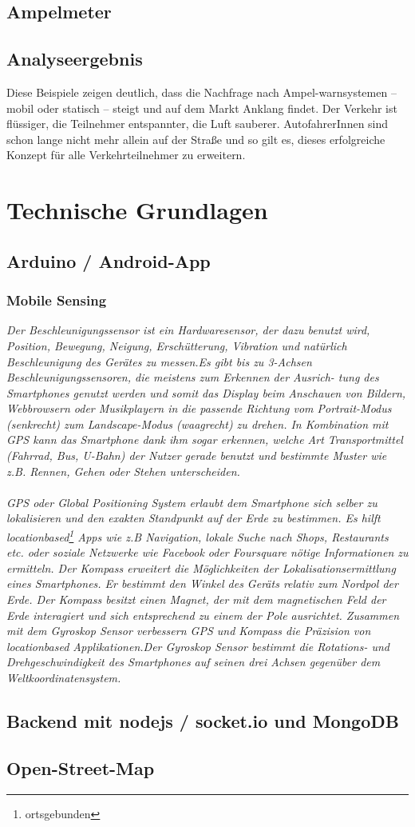 \subsection{Ampelmeter}
\subsection{Analyseergebnis}
Diese Beispiele zeigen deutlich, dass die Nachfrage nach Ampel-warnsystemen -- mobil oder statisch -- steigt und auf dem Markt Anklang findet. Der Verkehr ist flüssiger, die Teilnehmer entspannter, die Luft sauberer. AutofahrerInnen sind schon lange nicht mehr allein auf der Straße und so gilt es, dieses erfolgreiche Konzept für alle Verkehrteilnehmer zu erweitern.
\section{Technische Grundlagen}
\subsection{Arduino / Android-App}
\subsubsection{Mobile Sensing}
\textit{Der Beschleunigungssensor ist ein Hardwaresensor, der dazu benutzt wird, Position, Bewegung, Neigung, Erschütterung, Vibration und natürlich Beschleunigung des Gerätes zu messen.Es gibt bis zu 3-Achsen Beschleunigungssensoren, die meistens zum Erkennen der Ausrich-
tung des Smartphones genutzt werden und somit das Display beim Anschauen von Bildern,
Webbrowsern oder Musikplayern in die passende Richtung vom Portrait-Modus (senkrecht)
zum Landscape-Modus (waagrecht) zu drehen. In Kombination mit GPS kann das Smartphone
dank ihm sogar erkennen, welche Art Transportmittel (Fahrrad, Bus, U-Bahn) der Nutzer gerade
benutzt und bestimmte Muster wie z.B. Rennen, Gehen oder Stehen unterscheiden.\\\\
GPS oder Global Positioning System erlaubt dem Smartphone sich selber zu lokalisieren und
den exakten Standpunkt auf der Erde zu bestimmen. Es hilft locationbased\footnote{ortsgebunden} Apps wie z.B Navigation, lokale Suche nach Shops, Restaurants etc. oder soziale Netzwerke wie Facebook oder Foursquare nötige Informationen zu ermitteln. Der Kompass erweitert die Möglichkeiten der Lokalisationsermittlung eines Smartphones. Er bestimmt den Winkel des Geräts relativ zum Nordpol der Erde. Der Kompass besitzt einen Magnet, der mit dem magnetischen Feld der Erde interagiert und sich entsprechend zu einem der Pole ausrichtet. Zusammen mit dem Gyroskop Sensor verbessern GPS und Kompass die Präzision von locationbased Applikationen.Der Gyroskop Sensor bestimmt die Rotations- und Drehgeschwindigkeit des Smartphones auf seinen drei Achsen gegenüber dem Weltkoordinatensystem.}
\subsection{Backend mit nodejs / socket.io und MongoDB}
\subsection{Open-Street-Map}
